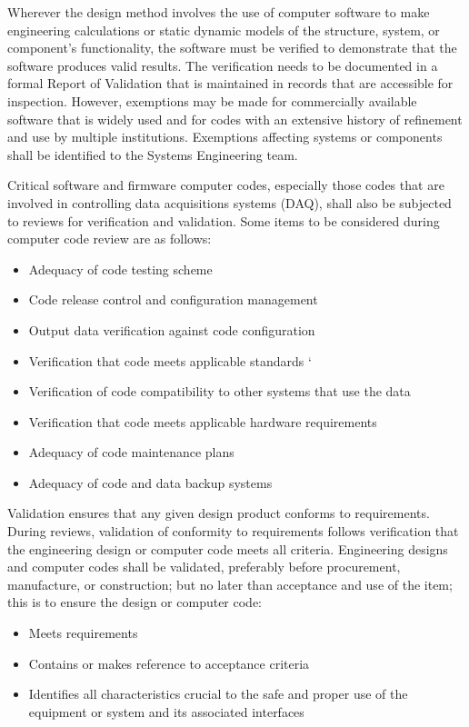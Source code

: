 Wherever the design method involves the use of
computer software to make engineering calculations or static dynamic
models of the structure, system, or component's functionality, the
software must be verified to demonstrate that the software produces
valid results. The verification needs to be documented in a formal
Report of Validation that is maintained in records that are accessible
for inspection. However, exemptions may be made for commercially
available software that is widely used and for codes with an extensive
history of refinement and use by multiple institutions. Exemptions
affecting systems or components shall be identified to the
 Systems Engineering team.

Critical software and firmware computer codes, especially those codes
that are involved in controlling  data acquisitions
systems (DAQ), shall also be subjected to reviews for verification and
validation. Some items to be considered during computer code review
are as follows:
\begin{itemize}
\item Adequacy of code testing scheme
\item Code release control and configuration management
  \item Output data verification against code configuration
  \item Verification that code meets applicable standards `
  \item Verification of code compatibility to other systems that use
    the data
  \item Verification that code meets applicable hardware requirements
  \item Adequacy of code maintenance plans
  \item Adequacy of code and data backup systems
\end{itemize}

Validation ensures that any given design product conforms to 
requirements.
During reviews, validation of conformity to requirements
follows verification that the engineering design or computer code
meets all criteria. Engineering designs and computer codes shall be
validated, preferably before procurement, manufacture, or
construction; but no later than acceptance and use of the item; this
is to ensure the design or computer code:
\begin{itemize}
 \item Meets  requirements
 \item Contains or makes reference to acceptance criteria
 \item Identifies all characteristics crucial to the safe and proper
   use of the equipment or system and its associated interfaces
\end{itemize}

